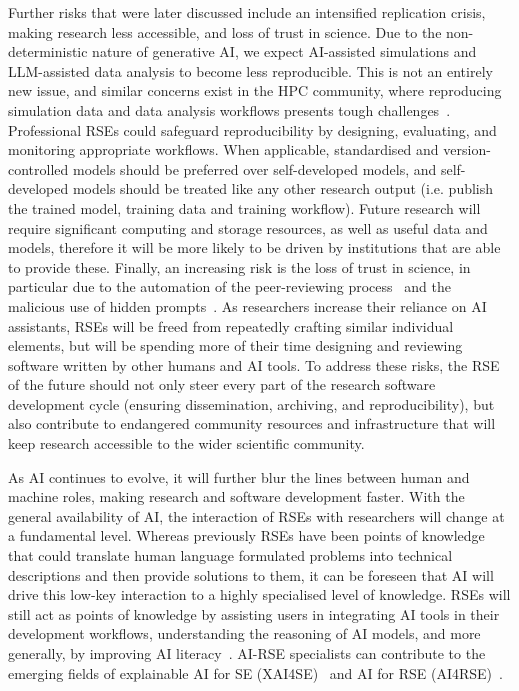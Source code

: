 \documentclass{eceasst}
\begin{document}
Further risks that were later discussed include an intensified replication crisis,
making research less accessible, and loss of trust in science.
Due to the non-deterministic nature of generative AI, we expect AI-assisted simulations
and LLM-assisted data analysis to become less reproducible.
This is not an entirely new issue, and similar concerns exist in the HPC community,
where reproducing simulation data and data analysis workflows presents tough challenges~\cite{Antunes2024}.
Professional RSEs could safeguard reproducibility by designing, evaluating, and monitoring appropriate workflows.
When applicable, standardised and version-controlled models should be preferred
over self-developed models, and self-developed models should be treated like any
other research output (i.e. publish the trained model, training data and training workflow).
Future research will require significant computing and storage resources, as well as useful data and models,
therefore it will be more likely to be driven by institutions that are able to provide these.
Finally, an increasing risk is the loss of trust in science,
in particular due to the automation of the peer-reviewing process~\cite{Naddaf2025}
and the malicious use of hidden prompts~\cite{Gibney2025}.
As researchers increase their reliance on AI assistants,
RSEs will be freed from repeatedly crafting similar individual elements,
but will be spending more of their time designing and reviewing software written by other humans and AI tools.
To address these risks, the RSE of the future should not only steer every part
of the research software development cycle (ensuring dissemination, archiving, and reproducibility),
but also contribute to endangered community resources and infrastructure that
will keep research accessible to the wider scientific community.

As AI continues to evolve, it will further blur the lines between human and machine roles, making research and software development faster.
With the general availability of AI, the interaction of RSEs with researchers will change at a fundamental level.
Whereas previously RSEs have been points of knowledge that could translate
human language formulated problems into technical descriptions and then provide solutions to them,
it can be foreseen that AI will drive this low-key interaction to a highly specialised level of knowledge.
RSEs will still act as points of knowledge by assisting users in integrating
AI tools in their development workflows, understanding the reasoning of AI models,
and more generally, by improving AI literacy~\cite{Alenezi2025}.
AI-RSE specialists can contribute to the emerging fields of explainable
AI for SE (XAI4SE)~\cite{Mohammadkhani2023v1} and AI for RSE (AI4RSE)~\cite{Farshidi2025v1}.
\end{document}
